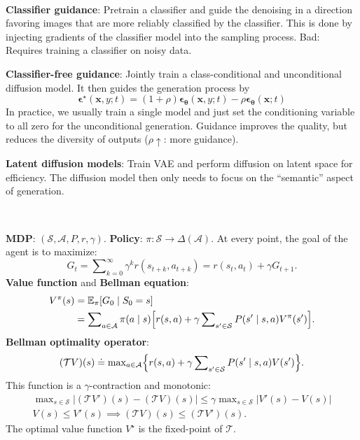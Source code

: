 \documentclass{article}
\newcommand{\lft}{\mathopen{}\mathclose\bgroup\left}
\newcommand{\rgt}{\aftergroup\egroup\right}
\newcommand{\E}{\mathbb{E}}
\renewcommand{\vec}[1]{\bm{#1}}
\newenvironment{topic}[1]
{\textbf{\sffamily \colorbox{black}{\rlap{\textbf{\textcolor{white}{#1}}}\hspace{\linewidth}\hspace{-2\fboxsep}}} \\ \vspace{0.2cm}}
{}
\begin{document}
\begin{multicols*}{2}
\begin{topic}{Diffusion models}
        \textbf{Classifier guidance}: Pretrain a classifier and guide the denoising in a direction
        favoring images that are more reliably classified by the classifier. This is done by
        injecting gradients of the classifier model into the sampling process. Bad: Requires
        training a classifier on noisy data.

        \textbf{Classifier-free guidance}: Jointly train a class-conditional and unconditional diffusion model. It then guides the generation process by \[
            \vec{\epsilon}^\star(\vec{x}, y; t) = (1 + \rho) \vec{\epsilon}_{\vec{\theta}}(\vec{x}, y; t) - \rho \vec{\epsilon}_{\vec{\theta}}(\vec{x}; t)
        \]
        In practice, we usually train a single model and just set the conditioning variable to all zero for
        the unconditional generation. Guidance improves the quality, but reduces the diversity of outputs
        ($\rho \uparrow$: more guidance).

        \textbf{Latent diffusion models}: Train VAE and perform diffusion on latent space for
        efficiency. The diffusion model then only needs to focus on the ``semantic'' aspect of
        generation.

    \end{topic}

    \begin{topic}{Reinforcement learning}

        \textbf{MDP}: $(\mathcal{S}, \mathcal{A}, P, r, \gamma)$. \textbf{Policy}: $\pi: \mathcal{S} \to
            \Delta(\mathcal{A})$. At every point, the goal of the agent is to maximize: \[
            G_t = \sum\nolimits_{k=0}^{\infty} \gamma^k r(s_{t+k}, a_{t+k}) = r(s_t, a_t) + \gamma G_{t+1}.
        \]
        \textbf{Value function} and \textbf{Bellman equation}:
        \begin{align*}
            V^\pi(s) & = \E_{\pi} [G_0 \mid S_0 = s]                                                                                                               \\
                     & = \sum\nolimits_{a \in \mathcal{A}} \pi(a \mid s) \lft[ r(s,a) + \gamma \sum\nolimits_{s' \in \mathcal{S}} P(s' \mid s, a) V^\pi(s') \rgt].
        \end{align*}
        \textbf{Bellman optimality operator}: \[
            (\mathcal{T} V) (s) \doteq \max\nolimits_{a \in \mathcal{A}} \lft\{ r(s,a) + \gamma \sum\nolimits_{s' \in \mathcal{S}} P(s' \mid s, a) V(s') \rgt\}.
        \]
        This function is a $\gamma$-contraction and monotonic:
        \begin{gather*}
            \max\nolimits_{s \in \mathcal{S}} |(\mathcal{T}V')(s) - (\mathcal{T}V)(s)| \leq \gamma \max\nolimits_{s \in \mathcal{S}} |V'(s) - V(s)| \\
            V(s) \leq V'(s) \implies (\mathcal{T}V)(s) \leq (\mathcal{T}V')(s).
        \end{gather*}
        The optimal value function $V^\star$ is the fixed-point of $\mathcal{T}$.


\end{topic}
\end{multicols*}
\end{document}
